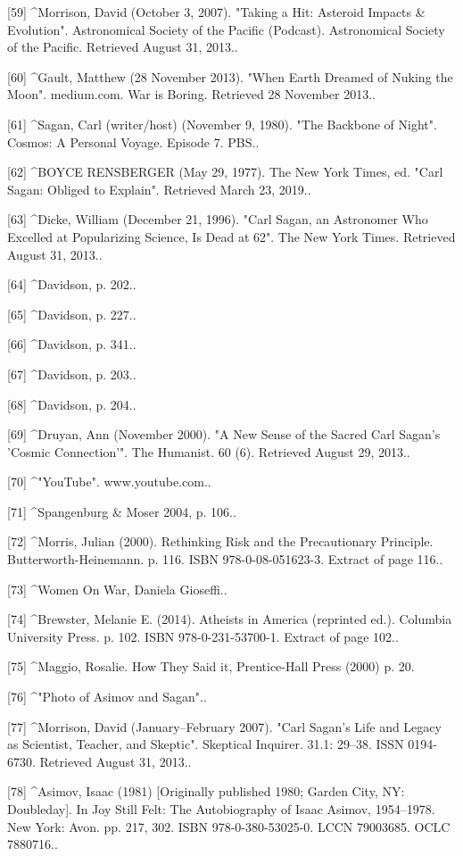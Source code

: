 [59]
^Morrison, David (October 3, 2007). "Taking a Hit: Asteroid Impacts & Evolution". Astronomical Society of the Pacific (Podcast). Astronomical Society of the Pacific. Retrieved August 31, 2013..

[60]
^Gault, Matthew (28 November 2013). "When Earth Dreamed of Nuking the Moon". medium.com. War is Boring. Retrieved 28 November 2013..

[61]
^Sagan, Carl (writer/host) (November 9, 1980). "The Backbone of Night". Cosmos: A Personal Voyage. Episode 7. PBS..

[62]
^BOYCE RENSBERGER (May 29, 1977). The New York Times, ed. "Carl Sagan: Obliged to Explain". Retrieved March 23, 2019..

[63]
^Dicke, William (December 21, 1996). "Carl Sagan, an Astronomer Who Excelled at Popularizing Science, Is Dead at 62". The New York Times. Retrieved August 31, 2013..

[64]
^Davidson, p. 202..

[65]
^Davidson, p. 227..

[66]
^Davidson, p. 341..

[67]
^Davidson, p. 203..

[68]
^Davidson, p. 204..

[69]
^Druyan, Ann (November 2000). "A New Sense of the Sacred Carl Sagan's 'Cosmic Connection'". The Humanist. 60 (6). Retrieved August 29, 2013..

[70]
^"YouTube". www.youtube.com..

[71]
^Spangenburg & Moser 2004, p. 106..

[72]
^Morris, Julian (2000). Rethinking Risk and the Precautionary Principle. Butterworth-Heinemann. p. 116. ISBN 978-0-08-051623-3. Extract of page 116..

[73]
^Women On War, Daniela Gioseffi..

[74]
^Brewster, Melanie E. (2014). Atheists in America (reprinted ed.). Columbia University Press. p. 102. ISBN 978-0-231-53700-1. Extract of page 102..

[75]
^Maggio, Rosalie. How They Said it, Prentice-Hall Press (2000) p. 20.

[76]
^"Photo of Asimov and Sagan"..

[77]
^Morrison, David (January–February 2007). "Carl Sagan's Life and Legacy as Scientist, Teacher, and Skeptic". Skeptical Inquirer. 31.1: 29–38. ISSN 0194-6730. Retrieved August 31, 2013..

[78]
^Asimov, Isaac (1981) [Originally published 1980; Garden City, NY: Doubleday]. In Joy Still Felt: The Autobiography of Isaac Asimov, 1954–1978. New York: Avon. pp. 217, 302. ISBN 978-0-380-53025-0. LCCN 79003685. OCLC 7880716..

